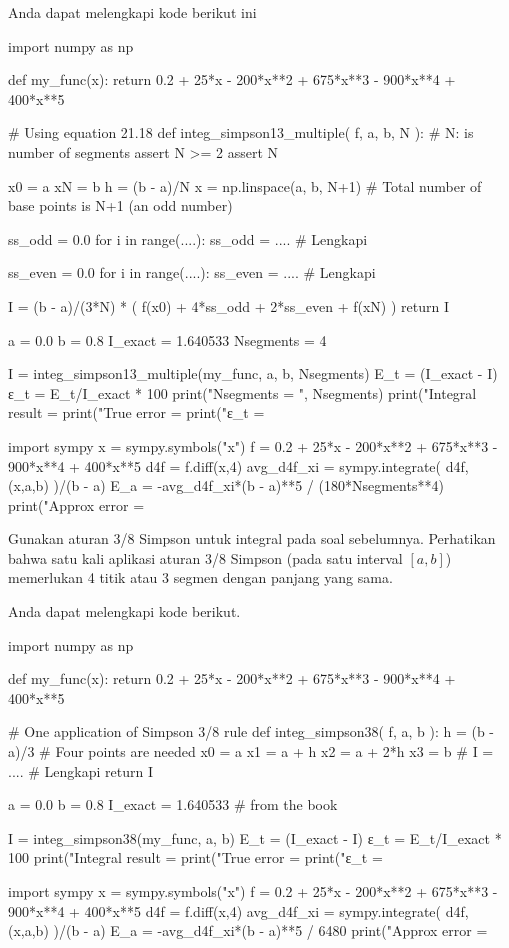 Anda dapat melengkapi kode berikut ini
\begin{pythoncode}
    import numpy as np

    def my_func(x):
        return 0.2 + 25*x - 200*x**2 + 675*x**3 - 900*x**4 + 400*x**5
    
# Using equation 21.18
def integ_simpson13_multiple( f, a, b, N ):
    # N: is number of segments
    assert N >= 2
    assert N %

    x0 = a
    xN = b
    h = (b - a)/N
    x = np.linspace(a, b, N+1)
    # Total number of base points is N+1 (an odd number)

    ss_odd = 0.0
    for i in range(....):
        ss_odd = .... # Lengkapi
    
    ss_even = 0.0
    for i in range(....):
        ss_even = .... # Lengkapi

    I = (b - a)/(3*N) * ( f(x0) + 4*ss_odd + 2*ss_even + f(xN) )
    return I
    
a = 0.0
b = 0.8
I_exact = 1.640533
Nsegments = 4
    
I = integ_simpson13_multiple(my_func, a, b, Nsegments)
E_t = (I_exact - I)
ε_t = E_t/I_exact * 100
print("Nsegments = ", Nsegments)
print("Integral result = %
print("True error      = %
print("ε_t             = %
    
import sympy
x = sympy.symbols("x")
f = 0.2 + 25*x - 200*x**2 + 675*x**3 - 900*x**4 + 400*x**5
d4f = f.diff(x,4)
avg_d4f_xi = sympy.integrate( d4f, (x,a,b) )/(b - a)
E_a = -avg_d4f_xi*(b - a)**5 / (180*Nsegments**4)
print("Approx error    = %
\end{pythoncode}

\begin{soal}
Gunakan aturan 3/8 Simpson untuk integral pada soal sebelumnya.
Perhatikan bahwa satu kali aplikasi aturan 3/8 Simpson (pada satu interval
$[a,b]$) memerlukan 4 titik atau 3 segmen dengan panjang yang sama.
\end{soal}

Anda dapat melengkapi kode berikut.
\begin{pythoncode}
import numpy as np

def my_func(x):
    return 0.2 + 25*x - 200*x**2 + 675*x**3 - 900*x**4 + 400*x**5

# One application of Simpson 3/8 rule
def integ_simpson38( f, a, b ):
    h = (b - a)/3
    # Four points are needed
    x0 = a
    x1 = a + h
    x2 = a + 2*h
    x3 = b
    #
    I = .... # Lengkapi
    return I
    
a = 0.0
b = 0.8
I_exact = 1.640533 # from the book
    
I = integ_simpson38(my_func, a, b)
E_t = (I_exact - I)
ε_t = E_t/I_exact * 100
print("Integral result = %
print("True error      = %
print("ε_t             = %
    
import sympy
x = sympy.symbols("x")
f = 0.2 + 25*x - 200*x**2 + 675*x**3 - 900*x**4 + 400*x**5
d4f = f.diff(x,4)
avg_d4f_xi = sympy.integrate( d4f, (x,a,b) )/(b - a)
E_a = -avg_d4f_xi*(b - a)**5 / 6480
print("Approx error    = %
\end{pythoncode}


